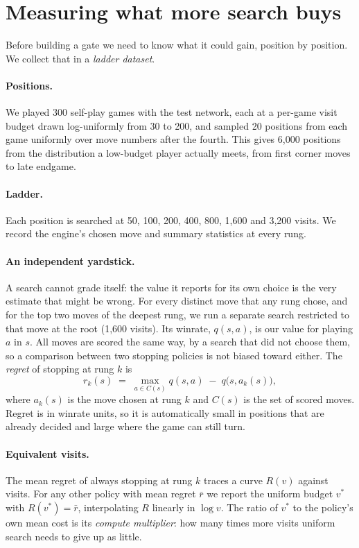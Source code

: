 \section{Measuring what more search buys}
\label{sec:ladder}

Before building a gate we need to know what it could gain, position by position. We collect that in a \emph{ladder dataset}.

\paragraph{Positions.}
We played 300 self-play games with the test network, each at a per-game visit budget drawn log-uniformly from 30 to 200, and sampled 20 positions from each game uniformly over move numbers after the fourth. This gives 6{,}000 positions from the distribution a low-budget player actually meets, from first corner moves to late endgame.

\paragraph{Ladder.}
Each position is searched at 50, 100, 200, 400, 800, 1{,}600 and 3{,}200 visits. We record the engine's chosen move and summary statistics at every rung.

\paragraph{An independent yardstick.}
A search cannot grade itself: the value it reports for its own choice is the very estimate that might be wrong. For every distinct move that any rung chose, and for the top two moves of the deepest rung, we run a separate search restricted to that move at the root (1{,}600 visits). Its winrate, $q(s,a)$, is our value for playing $a$ in $s$. All moves are scored the same way, by a search that did not choose them, so a comparison between two stopping policies is not biased toward either. The \emph{regret} of stopping at rung $k$ is
\begin{equation}
  r_k(s) \;=\; \max_{a \in C(s)} q(s,a) \;-\; q\bigl(s, a_k(s)\bigr),
\end{equation}
where $a_k(s)$ is the move chosen at rung $k$ and $C(s)$ is the set of scored moves. Regret is in winrate units, so it is automatically small in positions that are already decided and large where the game can still turn.

\paragraph{Equivalent visits.}
The mean regret of always stopping at rung $k$ traces a curve $R(v)$ against visits. For any other policy with mean regret $\bar r$ we report the uniform budget $v^\ast$ with $R(v^\ast)=\bar r$, interpolating $R$ linearly in $\log v$. The ratio of $v^\ast$ to the policy's own mean cost is its \emph{compute multiplier}: how many times more visits uniform search needs to give up as little.

